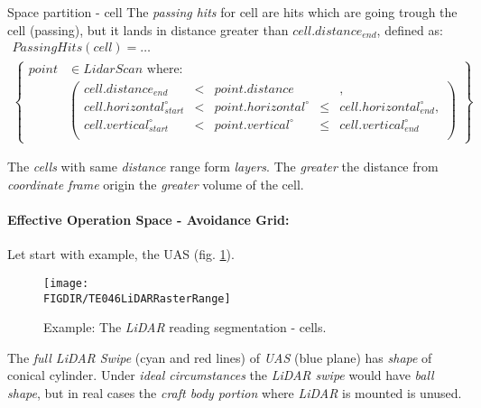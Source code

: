 \begin{definition}{Space partition - cell}
    The \emph{passing hits} for cell are hits which are going trough the cell (passing), but it lands in distance greater than $cell.distance_{end}$, defined as:
    \begin{multline}\label{eq:passingHitsCell}
        Passing Hits(cell)=
        \dots\\
            \left \{
                \begin{aligned}
                point& \in Lidar Scan \text{ where}:\\
                    &\left(\begin{aligned}
                        cell.distance_{end}&<& point.distance &&,\\
                        cell.horizontal^\circ_{start} &<& point.horizontal^\circ &\le&  cell.horizontal^\circ_{end},\\
                        cell.vertical^\circ_{start} &<& point.vertical^\circ &\le& cell.vertical^\circ_{end}\\
                    \end{aligned}\right)
                \end{aligned}
            \right\}
    \end{multline}
\end{definition}

\begin{note}
    The \emph{cells} with same \emph{distance} range form \emph{layers}. The \emph{greater} the distance from \emph{coordinate frame} origin the \emph{greater} volume of the cell.     
\end{note}

\paragraph{Effective Operation Space - Avoidance Grid:} Let start with example, the UAS  (fig. \ref{fig:LidarSpaceSegmentation}). 

\begin{figure}[H]
    \centering
    \texttt{[image: \\FIGDIR/TE046LiDARRasterRange]} 
    \caption{Example: The \emph{LiDAR} reading segmentation - cells.}
    \label{fig:LidarSpaceSegmentation}
\end{figure}

The \emph{full LiDAR Swipe} (cyan and red lines) of \emph{UAS} (blue plane) has \emph{shape} of conical cylinder. Under \emph{ideal circumstances} the \emph{LiDAR swipe} would have \emph{ball shape}, but in real cases the \emph{craft body portion} where \emph{LiDAR} is mounted is unused.

